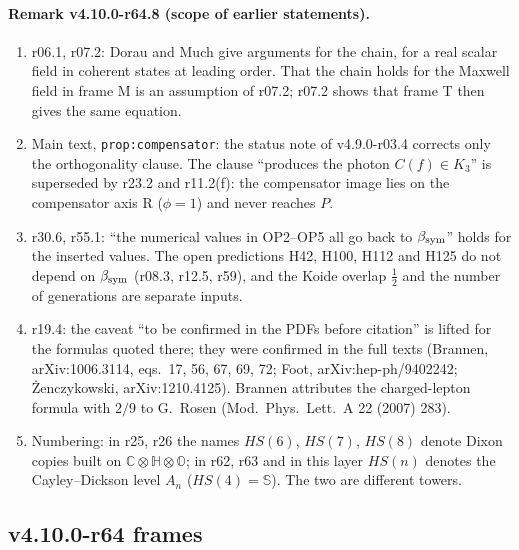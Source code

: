 \paragraph{Remark v4.10.0-r64.8 (scope of earlier statements).}
\begin{enumerate}[leftmargin=2em]
\item[(a)] r06.1, r07.2: Dorau and Much give arguments for the chain, for a real scalar field in coherent states at leading order.  That the
chain holds for the Maxwell field in frame M is an assumption of r07.2; r07.2 shows that frame T then gives the same equation.
\item[(b)] Main text, \texttt{prop:compensator}: the status note of v4.9.0-r03.4 corrects only the orthogonality clause.  The clause ``produces
the photon \(C(f)\in K_3\)'' is superseded by r23.2 and r11.2(f): the compensator image lies on the compensator axis R (\(\phi=1\)) and never
reaches \(P\).
\item[(c)] r30.6, r55.1: ``the numerical values in OP2--OP5 all go back to \(\beta_{\rm sym}\)'' holds for the inserted values.  The open
predictions H42, H100, H112 and H125 do not depend on \(\beta_{\rm sym}\) (r08.3, r12.5, r59), and the Koide overlap \(\tfrac12\) and the number
of generations are separate inputs.
\item[(d)] r19.4: the caveat ``to be confirmed in the PDFs before citation'' is lifted for the formulas quoted there; they were confirmed in the
full texts (Brannen, arXiv:1006.3114, eqs.~17, 56, 67, 69, 72; Foot, arXiv:hep-ph/9402242; \.Zenczykowski, arXiv:1210.4125).  Brannen attributes
the charged-lepton formula with \(2/9\) to G.~Rosen (Mod.\ Phys.\ Lett.\ A 22 (2007) 283).
\item[(e)] Numbering: in r25, r26 the names \(HS(6)\), \(HS(7)\), \(HS(8)\) denote Dixon copies built on \(\mathbb C\otimes\mathbb H\otimes\mathbb O\);
in r62, r63 and in this layer \(HS(n)\) denotes the Cayley--Dickson level \(A_n\) (\(HS(4)=\mathbb S\)).  The two are different towers.
\end{enumerate}

\subsection*{v4.10.0-r64 frames}
\label{subsec:v4100-r64-frames}

